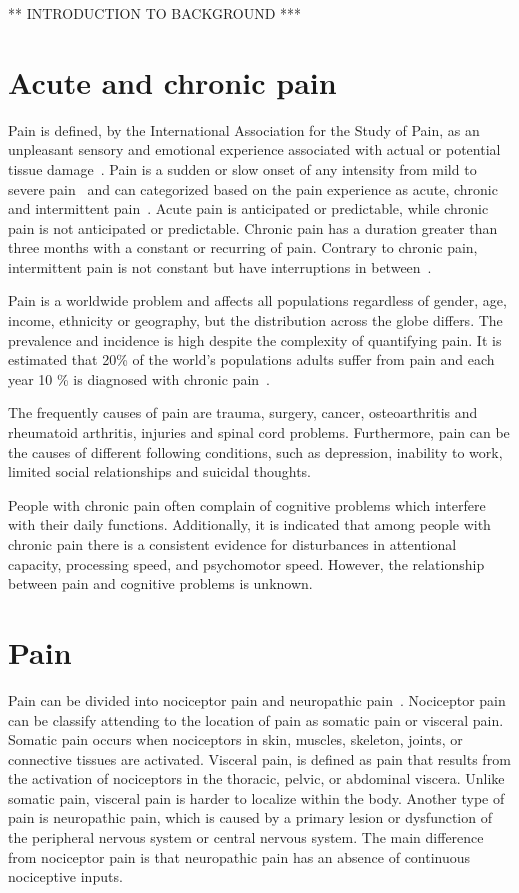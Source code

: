 ** INTRODUCTION TO BACKGROUND ***

\section{Acute and chronic pain}
Pain is defined, by the International Association for the Study of Pain, as an unpleasant sensory and emotional experience associated with actual or potential tissue damage~\cite{Kerstman2013}. 
Pain is a sudden or slow onset of any intensity from mild to severe pain~\cite{Mello2016} and can categorized based on the pain experience as acute, chronic and intermittent pain~\cite{Goldberg2011}. Acute pain is anticipated or predictable, while  chronic pain is not anticipated or predictable. Chronic pain has a duration greater than three months with a constant or recurring of pain. Contrary to chronic pain, intermittent pain is not constant but have interruptions in between~\cite{Mello2016}.

Pain is a worldwide problem and affects all populations regardless of gender, age, income, ethnicity or geography, but the distribution across the globe differs. The prevalence and incidence is high despite the complexity of quantifying pain. It is estimated that 20\% of the world's populations adults suffer from pain and each year 10 \% is diagnosed with chronic pain~\cite{Goldberg2011}. 

The frequently causes of pain are trauma, surgery, cancer, osteoarthritis and rheumatoid arthritis, injuries and spinal cord problems. Furthermore, pain can be the causes of different following conditions, such as depression, inability to work, limited social relationships and suicidal thoughts.~\cite{Goldberg2011, Breivik2006}

People with chronic pain often complain of cognitive problems which interfere with their daily functions. Additionally, it is indicated that among people with chronic pain there is a consistent evidence for disturbances in attentional capacity, processing speed, and psychomotor speed. However, the relationship between pain and cognitive problems is unknown.~\cite{Geisser2018}

\section{Pain}
Pain can be divided into nociceptor pain and neuropathic pain~\cite{Steeds2013}. Nociceptor pain can be classify attending to the location of pain as somatic pain or visceral pain. Somatic pain occurs when nociceptors in skin, muscles, skeleton, joints, or connective tissues are activated. Visceral pain, is defined as pain that results from the activation of nociceptors in the thoracic, pelvic, or abdominal viscera. Unlike somatic pain, visceral pain is harder to localize within the body. Another type of pain is neuropathic pain, which is caused by a primary lesion or dysfunction of the peripheral nervous system or central nervous system. The main difference from nociceptor pain is that neuropathic pain has an absence of continuous nociceptive inputs. \cite{Kerstman2013}

